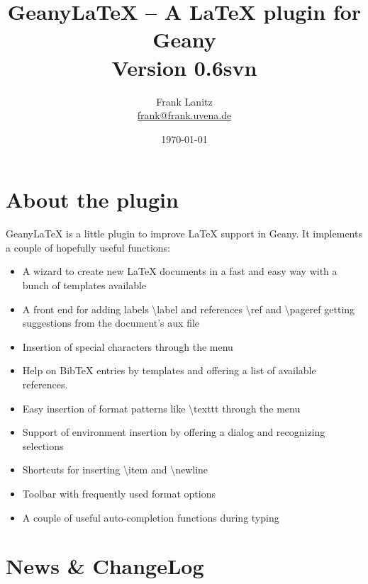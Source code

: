 \documentclass[%
paper=a4,%
fontsize=11pt,%
twoside=false,%
DIV18,%
headsepline,%
plainheadsepline,%
footsepline,%
plainfootsepline,%
bibliography=totoc,%
listof=totoc,%
BCOR10mm,%
parskip=half,%
openany,%
]{scrartcl}
\title{Geany\LaTeX{} -- A \LaTeX{} plugin for Geany \\[1.5ex]
	   \normalsize Version 0.6svn}
\author{Frank Lanitz \\ \small{\href{mailto:frank@frank.uvena.de}{frank@frank.uvena.de}}}
\date{\today}
\begin{document}
\dedication{\normalsize \textbf{Note:} Please note that this document has been created on
\today. If you are using a devel version from SVN, please compile and check
\texttt{doc/geanylatex.tex} from sources. Please check Page \pageref
{sec:compiling_of_documentation}, Section \ref{sec:compiling_of_documentation} on how to do this. }


\maketitle
\tableofcontents
\listoftables
\listoffigures{}
\lstlistoflistings{}

\newpage
{}
\section{About the plugin}

Geany\LaTeX{} is a little plugin to improve \LaTeX{} support in Geany.
It implements a couple of hopefully useful functions:

\begin{itemize}
	\item A wizard to create new \LaTeX{} documents in a fast and easy way
	 	  with a bunch of templates available
	\item A front end for adding labels \textbackslash label{} and
		  references \textbackslash ref{} and \textbackslash pageref{}
   		  getting suggestions from the document's aux file
	\item Insertion of special characters through the menu
	\item Help on BibTeX entries by templates and offering a list of
		  available references.
	\item Easy insertion of format patterns like \textbackslash texttt{}
		  through the menu
	\item Support of environment insertion by offering a dialog and
		  recognizing selections
	\item Shortcuts for inserting \textbackslash item and
		  \textbackslash newline
	\item Toolbar with frequently used format options
	\item A couple of useful auto-completion functions during typing
\end{itemize}

\newpage
\section{News \& ChangeLog}
\end{document}
